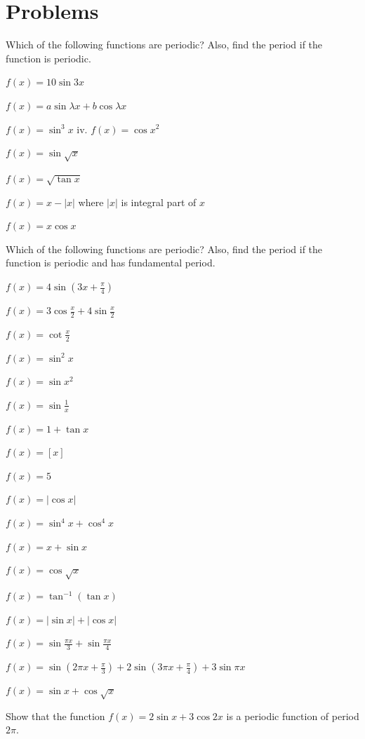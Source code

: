 \section{Problems}
\startitemize[n, 1*broad]
\item Which of the following functions are periodic? Also, find the period if the function is periodic.
\item $f(x) = 10\sin3x$
\item $f(x) = a\sin\lambda x + b\cos\lambda x$
\item $f(x) = \sin^3x$ iv. $f(x) = \cos x^2$
\item $f(x) = \sin\sqrt{x}$
\item $f(x) = \sqrt{\tan x}$
\item $f(x) = x - |x|$ where $|x|$ is integral part of $x$
\item $f(x) = x\cos x$
  \stopitemize

\item Which of the following functions are periodic? Also, find the period if the function is periodic and has
  fundamental period.
\item $f(x) = 4\sin\left(3x + \frac{\pi}{4}\right)$
\item $f(x) = 3\cos\frac{x}{2} + 4\sin\frac{x}{2}$
\item $f(x) = \cot\frac{x}{2}$
\item $f(x) = \sin^2x$
\item $f(x) = \sin x^2$
\item $f(x) = \sin\frac{1}{x}$
\item $f(x) = 1 + \tan x$
\item $f(x) = [x]$
\item $f(x) = 5$
\item $f(x) = |\cos x|$
\item $f(x) = \sin^4x + \cos^4x$
\item $f(x) = x + \sin x$
\item $f(x) = \cos\sqrt{x}$
\item $f(x) = \tan^{-1}(\tan x)$
\item $f(x) = |\sin x| + |\cos x|$
\item $f(x) = \sin\frac{\pi x}{3} + \sin\frac{\pi x}{4}$
\item $f(x) = \sin\left(2\pi x + \frac{\pi}{3}\right) + 2\sin\left(3\pi x + \frac{\pi}{4}\right) + 3\sin\pi x$
\item $f(x) = \sin x + \cos\sqrt{x}$
\stopitemize
\item Show that the function $f(x) = 2\sin x + 3\cos 2x$ is a periodic function of period $2\pi$.


